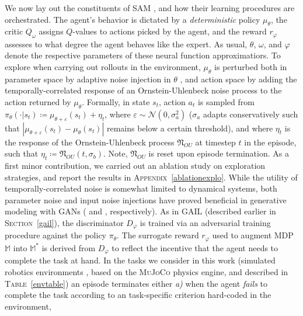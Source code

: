 We now lay out the constituents of SAM \cite{Blonde2019-vc}, and how their learning
procedures are orchestrated.
The agent's behavior is dictated by a \emph{deterministic} policy $\mu_\theta$,
the critic $Q_\omega$ assigns $Q$-values to actions picked by the agent,
and the reward $r_\varphi$ assesses to what degree the agent behaves like the expert.
As usual, $\theta$, $\omega$, and $\varphi$ denote the respective parameters of
these neural function approximatiors.
To explore when carrying out rollouts in the environment, $\mu_\theta$ is perturbed
both in parameter space by adaptive noise injection in $\theta$
\cite{Plappert2018-rl, Fortunato2017-af},
and action space by adding the temporally-correlated response
of an Ornstein-Uhlenbeck noise process \cite{Uhlenbeck1930-an,Lillicrap2016-xa}
to the action returned by $\mu_\theta$.
Formally, in state $s_t$, action $a_t$ is sampled from
$\pi_\theta(\cdot | s_t) \coloneqq \mu_{\theta + \varepsilon}(s_t) + \eta_t$,
where $\varepsilon \sim \mathcal{N}(0, \sigma_a^2)$ ($\sigma_a$ adapts conservatively such that
$|\mu_{\theta + \varepsilon}(s_t) - \mu_\theta(s_t)|$ remains below a certain threshold),
and where $\eta_t$ is the response of the Ornstein-Uhlenbeck process \cite{Uhlenbeck1930-an}
$\mathfrak{N}_{OU}$ at timestep $t$ in the episode,
such that $\eta_t \coloneqq \mathfrak{N}_{OU}(t, \sigma_b)$.
Note, $\mathfrak{N}_{OU}$ is reset upon episode termination.
As a first minor contribution, we carried out an ablation study
on exploration strategies, and report the results in
\textsc{Appendix}~\ref{ablationexplo}.
While the utility of temporally-correlated noise is somewhat limited to dynamical systems,
both parameter noise and input noise injections
have proved beneficial in generative modeling with GANs
(\cite{Zhao2017-bs} and \cite{Arjovsky2017-ne}, respectively).
As in GAIL \cite{Ho2016-bv} (described earlier in \textsc{Section}~\ref{gail}),
the discriminator $D_\varphi$ is trained via an adversarial
training procedure \cite{Goodfellow2014-yk} against the policy $\pi_\theta$.
The surrogate reward $r_\varphi$ used to augment MDP $\mathbb{M}$ into $\mathbb{M}^*$
is derived from $D_\varphi$ to reflect the incentive that the agent needs to complete
the task at hand.
In the tasks we consider in this work
(simulated robotics environments \cite{Brockman2016-un},
based on the \textsc{MuJoCo} \cite{Todorov2012-gc} physics engine,
and described in \textsc{Table}~\ref{envtable})
an episode terminates either
\textit{a)} when the agent \textit{fails} to complete
the task according to an task-specific criterion hard-coded in the environment,
